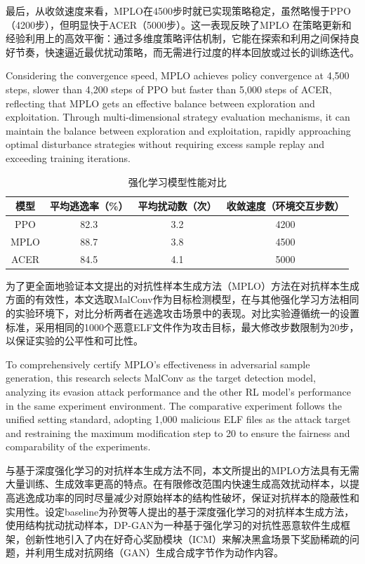 最后，从收敛速度来看，MPLO在4500步时就已实现策略稳定，虽然略慢于PPO（4200步），但明显快于ACER（5000步）。这一表现反映了MPLO 在策略更新和经验利用上的高效平衡：通过多维度策略评估机制，它能在探索和利用之间保持良好节奏，快速逼近最优扰动策略，而无需进行过度的样本回放或过长的训练迭代。

Considering the convergence speed, MPLO achieves policy convergence at 4,500 steps, slower than 4,200 steps of PPO but faster than 5,000 steps of ACER, reflecting that MPLO gets an effective balance between exploration and exploitation. Through multi-dimensional strategy evaluation mechanisms, it can maintain the balance between exploration and exploitation, rapidly approaching optimal disturbance strategies without requiring excess sample replay and exceeding training iterations.

\begin{table}[htbp]
	\centering
	\caption{强化学习模型性能对比}
	\label{tab:5.9}
	\begin{tabular*}{0.9\textwidth}{@{\extracolsep{\fill}}cccc}
		\toprule
		模型 & 平均逃逸率（\%） & 平均扰动数（次） & 收敛速度（环境交互步数） \\
		\midrule
		PPO & 82.3 & 3.2 & 4200 \\
		MPLO & 88.7 & 3.8 & 4500 \\
		ACER & 84.5 & 4.1 & 5000 \\
		\bottomrule
	\end{tabular*}
\end{table}

为了更全面地验证本文提出的对抗性样本生成方法（MPLO）方法在对抗样本生成方面的有效性，本文选取MalConv\cite{raff2017malware}作为目标检测模型，在与其他强化学习方法相同的实验环境下，对比分析两者在逃逸攻击场景中的表现。对比实验遵循统一的设置标准，采用相同的1000个恶意ELF文件作为攻击目标，最大修改步数限制为20步，以保证实验的公平性和可比性。

To comprehensively certify MPLO's effectiveness in adversarial sample generation, this research selects MalConv\cite{raff2017malware} as the target detection model, analyzing its evasion attack performance and the other RL model's performance in the same experiment environment. The comparative experiment follows the unified setting standard, adopting 1,000 malicious ELF files as the attack target and restraining the maximum modification step to 20 to ensure the fairness and comparability of the experiments.

与基于深度强化学习的对抗样本生成方法不同，本文所提出的MPLO方法具有无需大量训练、生成效率更高的特点。在有限修改范围内快速生成高效扰动样本，以提高逃逸成功率的同时尽量减少对原始样本的结构性破坏，保证对抗样本的隐蔽性和实用性。设定baseline为孙贺\cite{孙贺2024基于深度强化学习的恶意}等人提出的基于深度强化学习的对抗样本生成方法，使用结构扰动扰动样本，DP-GAN\cite{zhan2024enhancing}为一种基于强化学习的对抗性恶意软件生成框架，创新性地引入了内在好奇心奖励模块（ICM）来解决黑盒场景下奖励稀疏的问题，并利用生成对抗网络（GAN）生成合成字节作为动作内容。

